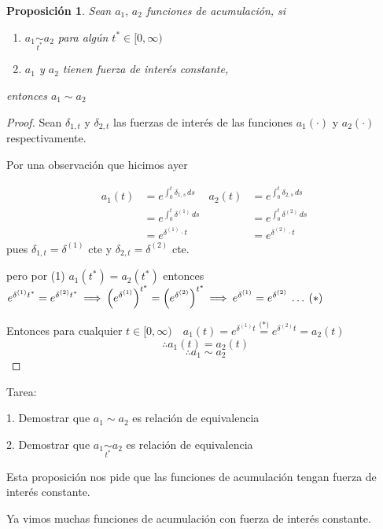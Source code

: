 \documentclass[
]{book}
\newtheorem{proposition}{Proposición}[chapter]
\theoremstyle{definition}
\theoremstyle{definition}
\theoremstyle{definition}
\theoremstyle{definition}
\theoremstyle{remark}
\begin{document}
\begin{proposition}
Sean \(a_1, \, a_2\) funciones de acumulación, si

\begin{enumerate}
\def\labelenumi{\arabic{enumi})}
\item
  \(a_1 \underset{t^{*}}{\sim} a_2\) para algún \(t^{*} \in [0, \infty)\)
\item
  \(a_1\) y \(a_2\) tienen fuerza de interés constante,
\end{enumerate}

entonces \(a_1 \sim a_2\)
\end{proposition}

\begin{proof}
Sean \(\delta_{1,t}\) y \(\delta_{2,t}\) las fuerzas de interés de las funciones \(a_1(\cdot)\) y \(a_2(\cdot)\) respectivamente.

Por una observación que hicimos ayer

\begin{align*}
a_1(t) &= e^{\int_{0}^{t} \delta_{1,s} \, ds} & a_2(t) &= e^{\int_{0}^{t} \delta_{2,s} \, ds}\\
&= e^{\int_{0}^{t} \delta^{(1)} \, ds}   &&= e^{\int_{0}^{t} \delta^{(2)} \, ds}\\
&= e^{\delta^{(1)}\cdot t}   &&= e^{\delta^{(2)}\cdot t}
\end{align*}
pues \(\delta_{1,t} = \delta^{(1)}\) cte y \(\delta_{2,t} = \delta^{(2)}\) cte.

pero por (1) \(a_1(t^{*}) = a_2(t^{*})\) entonces \(e^{\delta^{(1)}t^{*}} = e^{\delta^{(2)}t^{*}}\: \Longrightarrow \: \left( e^{\delta^{(1)}}\right) ^{t^*} = \left( e^{\delta^{(2)}}\right) ^{t^*} \\ \Longrightarrow \: e^{\delta^{(1)}} = e^{\delta^{(2)}}\: \ldots \: (*)\)

Entonces para cualquier \(t\in [0,\infty) \quad a_1(t) = e^{\delta^{(1)}t} \stackrel{\mbox{(*)}}{=} e^{\delta^{(2)}t} = a_2(t)\)
\[\: \therefore a_1(t) = a_2(t)\]
\[\: \therefore a_1 \sim a_2\]
\end{proof}

{Tarea:}

{1. Demostrar que \(a_1 \sim a_2\) es relación de equivalencia}

{2. Demostrar que \(a_1 \underset{t^{*}}{\sim} a_2\) es relación de equivalencia}

Esta proposición nos pide que las funciones de acumulación tengan fuerza de interés constante.

Ya vimos muchas funciones de acumulación con fuerza de interés constante.
\end{document}
